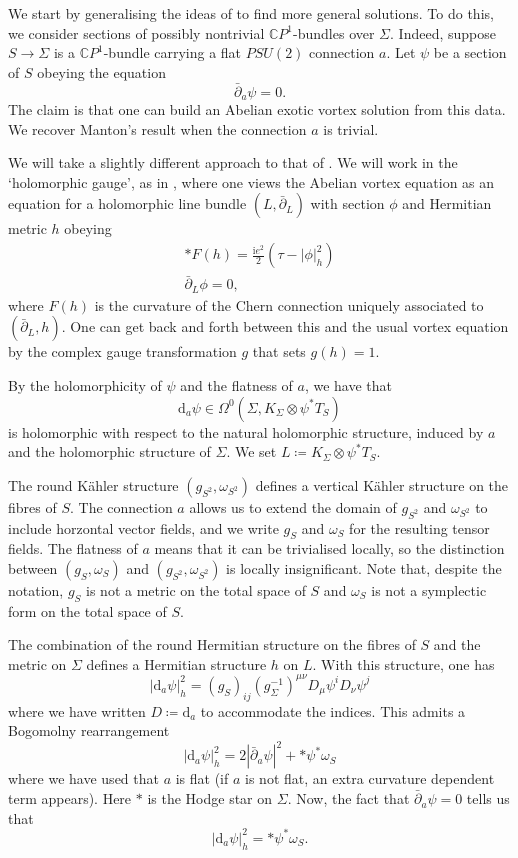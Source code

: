 \documentclass[10pt]{article}
\newcommand{\ii}{\text{i}}
\newcommand{\dd}{\textrm{d}}
\newcommand{\db}{\bar{\partial}}
\theoremstyle{definition}
\begin{document}
We start by generalising the ideas of \cite{mantonFVE} to find more general solutions. To do this, we consider sections of possibly nontrivial \(\mathbb{C}P^1\)-bundles over \(\Sigma\). Indeed, suppose \(S \to \Sigma\) is a \(\mathbb{C}P^1\)-bundle carrying a flat \(PSU(2)\) connection \(a\). Let \(\psi\) be a section of \(S\) obeying the equation
\[
\db_a \psi = 0 \text{.}
\]
The claim is that one can build an Abelian exotic vortex solution from this data. We recover Manton's result when the connection \(a\) is trivial.

We will take a slightly different approach to that of \cite{mantonFVE}. We will work in the `holomorphic gauge', as in \cite{bradlowVLB}, where one views the Abelian vortex equation as an equation for a holomorphic line bundle \((L,\db_L)\) with section \(\phi\) and Hermitian metric \(h\) obeying
\begin{equation}
\label{eq:holgauge}
\begin{gathered}
	*F(h) = \frac{\ii e^2}{2}(\tau - |\phi|_h^2) \\
	\db_L \phi = 0\text{,}
	\end{gathered}
\end{equation}
where \(F(h)\) is the curvature of the Chern connection uniquely associated to \((\db_L , h)\). One can get back and forth between this and the usual vortex equation by the complex gauge transformation \(g\) that sets \(g(h) = 1\).

By the holomorphicity of \(\psi\) and the flatness of \(a\), we have that
\[
\dd_a \psi \in \Omega^0(\Sigma, K_\Sigma \otimes \psi^*T_S)
\]
is holomorphic with respect to the natural holomorphic structure, induced by \(a\) and the holomorphic structure of \(\Sigma\). We set \(L \coloneqq K_\Sigma \otimes \psi^*T_S\).

The round K\"ahler structure \((g_{S^2}, \omega_{S^2})\) defines a vertical K\"ahler structure on the fibres of \(S\). The connection \(a\) allows us to extend the domain of \(g_{S^2}\) and \(\omega_{S^2}\) to include horzontal vector fields, and we write \(g_S\) and \(\omega_S\) for the resulting tensor fields. The flatness of \(a\) means that it can be trivialised locally, so the distinction between \((g_S, \omega_S)\) and \((g_{S^2}, \omega_{S^2})\) is locally insignificant. Note that, despite the notation, \(g_S\) is not a metric on the total space of \(S\) and \(\omega_S\) is not a symplectic form on the total space of \(S\).

The combination of the round Hermitian structure on the fibres of \(S\) and the metric on \(\Sigma\) defines a Hermitian structure \(h\) on \(L\). With this structure, one has
\[
| \dd_a \psi |_h^2 = (g_{S})_{ij} (g_\Sigma^{-1})^{\mu \nu} D_\mu \psi^i D_\nu \psi^j
\]
where we have written \(D \coloneqq \dd_a\) to accommodate the indices. This admits a Bogomolny rearrangement
\[
|\dd_a \psi |_h^2 = 2 |\db_a \psi |^2 + * \psi^*\omega_S
\]
where we have used that \(a\) is flat (if \(a\) is not flat, an extra curvature dependent term appears). Here \(*\) is the Hodge star on \(\Sigma\). Now, the fact that \(\db_a \psi = 0\) tells us that
\begin{equation}
\label{eq:psi1}
|\dd_a \psi|_h^2 = * \psi^*\omega_S\text{.}
\end{equation}
\end{document}
